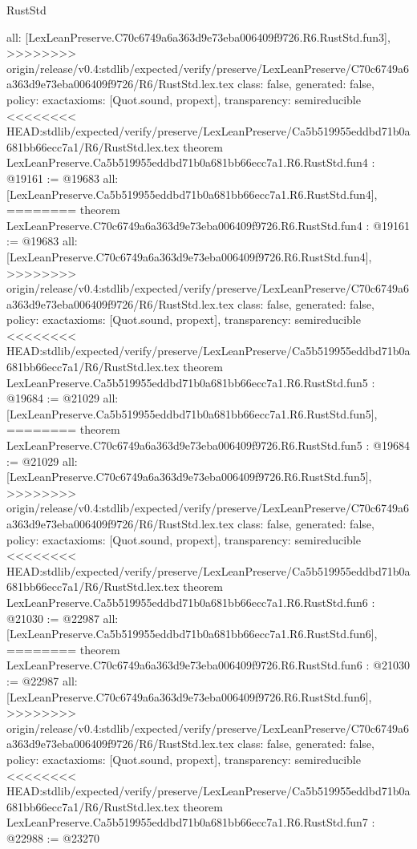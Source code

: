 \begin{lexlean}{RustStd}
\begin{coremodule}
{\begin{coremodule}
{{{{{{{  all: [LexLeanPreserve.C70c6749a6a363d9e73eba006409f9726.R6.RustStd.fun3],
>>>>>>>> origin/release/v0.4:stdlib/expected/verify/preserve/LexLeanPreserve/C70c6749a6a363d9e73eba006409f9726/R6/RustStd.lex.tex
  class: false,
  generated: false,
  policy: exact{axioms: [Quot.sound, propext]},
  transparency: semireducible
}
<<<<<<<< HEAD:stdlib/expected/verify/preserve/LexLeanPreserve/Ca5b519955eddbd71b0a681bb66ecc7a1/R6/RustStd.lex.tex
theorem LexLeanPreserve.Ca5b519955eddbd71b0a681bb66ecc7a1.R6.RustStd.fun4 : @19161 := @19683 {
  all: [LexLeanPreserve.Ca5b519955eddbd71b0a681bb66ecc7a1.R6.RustStd.fun4],
========
theorem LexLeanPreserve.C70c6749a6a363d9e73eba006409f9726.R6.RustStd.fun4 : @19161 := @19683 {
  all: [LexLeanPreserve.C70c6749a6a363d9e73eba006409f9726.R6.RustStd.fun4],
>>>>>>>> origin/release/v0.4:stdlib/expected/verify/preserve/LexLeanPreserve/C70c6749a6a363d9e73eba006409f9726/R6/RustStd.lex.tex
  class: false,
  generated: false,
  policy: exact{axioms: [Quot.sound, propext]},
  transparency: semireducible
}
<<<<<<<< HEAD:stdlib/expected/verify/preserve/LexLeanPreserve/Ca5b519955eddbd71b0a681bb66ecc7a1/R6/RustStd.lex.tex
theorem LexLeanPreserve.Ca5b519955eddbd71b0a681bb66ecc7a1.R6.RustStd.fun5 : @19684 := @21029 {
  all: [LexLeanPreserve.Ca5b519955eddbd71b0a681bb66ecc7a1.R6.RustStd.fun5],
========
theorem LexLeanPreserve.C70c6749a6a363d9e73eba006409f9726.R6.RustStd.fun5 : @19684 := @21029 {
  all: [LexLeanPreserve.C70c6749a6a363d9e73eba006409f9726.R6.RustStd.fun5],
>>>>>>>> origin/release/v0.4:stdlib/expected/verify/preserve/LexLeanPreserve/C70c6749a6a363d9e73eba006409f9726/R6/RustStd.lex.tex
  class: false,
  generated: false,
  policy: exact{axioms: [Quot.sound, propext]},
  transparency: semireducible
}
<<<<<<<< HEAD:stdlib/expected/verify/preserve/LexLeanPreserve/Ca5b519955eddbd71b0a681bb66ecc7a1/R6/RustStd.lex.tex
theorem LexLeanPreserve.Ca5b519955eddbd71b0a681bb66ecc7a1.R6.RustStd.fun6 : @21030 := @22987 {
  all: [LexLeanPreserve.Ca5b519955eddbd71b0a681bb66ecc7a1.R6.RustStd.fun6],
========
theorem LexLeanPreserve.C70c6749a6a363d9e73eba006409f9726.R6.RustStd.fun6 : @21030 := @22987 {
  all: [LexLeanPreserve.C70c6749a6a363d9e73eba006409f9726.R6.RustStd.fun6],
>>>>>>>> origin/release/v0.4:stdlib/expected/verify/preserve/LexLeanPreserve/C70c6749a6a363d9e73eba006409f9726/R6/RustStd.lex.tex
  class: false,
  generated: false,
  policy: exact{axioms: [Quot.sound, propext]},
  transparency: semireducible
}
<<<<<<<< HEAD:stdlib/expected/verify/preserve/LexLeanPreserve/Ca5b519955eddbd71b0a681bb66ecc7a1/R6/RustStd.lex.tex
theorem LexLeanPreserve.Ca5b519955eddbd71b0a681bb66ecc7a1.R6.RustStd.fun7 : @22988 := @23270 {
}}}}}}}}}}
\end{coremodule}}
\end{coremodule}
\end{lexlean}
